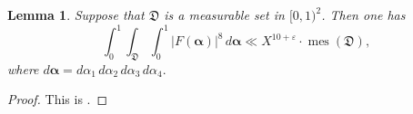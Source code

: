 \documentclass{amsart}%
\numberwithin{equation}{section}
\DeclareMathOperator{\mes}{mes}
\newtheorem{lemma}[theorem]{Lemma}
\theoremstyle{remark}
\newcommand{\1}{\mathbbm{1}}
\begin{document}
\begin{lemma}\label{k-1 dim measure}
    Suppose that $\mathfrak{D}$ is a measurable set in $[0,1)^{2}$.  Then one has
    \begin{equation*}
        \int_0^1\int_{\mathfrak{D}}\int_0^1 |F(\boldsymbol{\alpha})|^{8} \, d\boldsymbol{\alpha}\ll X^{10+\varepsilon}\cdot \mes{(\mathfrak{D})},
    \end{equation*}
where $d\boldsymbol{\alpha}=d\alpha_1 \, d\alpha_2 \, d\alpha_3 \, d\alpha_4.$
\end{lemma}

\begin{proof}
This is \cite[Lemma 4.1]{ky2026}.
\end{proof}

\end{document}
